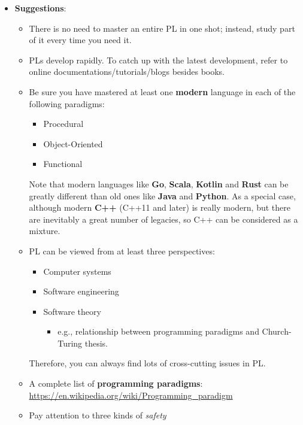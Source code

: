 \documentclass{article}
\begin{document}
\begin{itemize}
\begin{enumerate}
    \end{enumerate}
    \item \textbf{Suggestions}:
        \begin{itemize}
            \item There is no need to master an entire PL in one shot; instead, study part of it every time you need it.
            \item PLs develop rapidly. To catch up with the latest development, refer to online documentations/tutorials/blogs besides books.
            \item Be sure you have mastered at least one \textbf{modern} language in each of the following paradigms:
            \begin{itemize}
                \item Procedural
                \item Object-Oriented
                \item Functional
            \end{itemize}
            Note that modern languages like \textbf{Go}, \textbf{Scala}, \textbf{Kotlin} and \textbf{Rust} can be greatly different than old ones like \textbf{Java} and \textbf{Python}.
            As a special case, although modern \textbf{C++} (C++11 and later) is really modern, but there are inevitably a great number of legacies, so C++ can be considered as a mixture.
            \item PL can be viewed from at least three perspectives:
            \begin{itemize}
                \item Computer systems
                \item Software engineering
                \item Software theory
                \begin{itemize}
                    \item e.g., relationship between programming paradigms and Church-Turing thesis.
                \end{itemize}
            \end{itemize}
            Therefore, you can always find lots of cross-cutting issues in PL.
            \item A complete list of \textbf{programming paradigms}:\\
            \href{https://en.wikipedia.org/wiki/Programming\_paradigm}{https://en.wikipedia.org/wiki/Programming\_paradigm}
            \item Pay attention to three kinds of \emph{safety}

\end{itemize}
\end{itemize}
\end{document}
